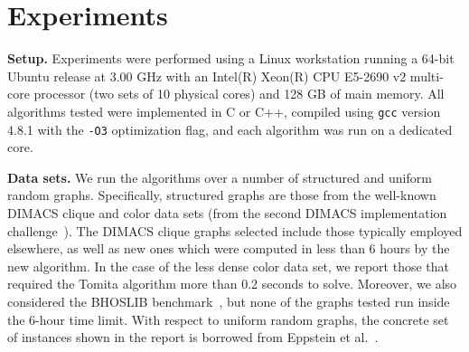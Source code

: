 \documentclass[final,1p]{elsarticle-modified}
\renewcommand{\paragraph}[1]{\medskip\noindent\textbf{#1.}}
\begin{document}
\section{Experiments}
\label{section:experiments}
\paragraph{Setup}
Experiments were performed using a Linux workstation running a 64-bit Ubuntu release at 3.00 GHz with an Intel(R) Xeon(R) CPU E5-2690 v2 multi-core processor (two sets of 10 physical cores) and 128 GB of main memory. All algorithms tested were implemented in C or C++, compiled using \texttt{gcc} version 4.8.1 with the \texttt{-O3} optimization flag, and each algorithm was run on a dedicated core.

\paragraph{Data sets}
We run the algorithms over a number of structured and uniform random graphs. Specifically, structured graphs are those from the well-known DIMACS clique and color data sets (from the second DIMACS implementation challenge~\cite{johnson1996}). The DIMACS clique graphs selected include those typically employed elsewhere, as well as new ones which were computed in less than 6 hours by the new algorithm. In the case of the less dense color data set, we report those that required the Tomita algorithm more than 0.2 seconds to solve. Moreover, we also considered the BHOSLIB benchmark~\cite{bhoslib}, but none of the graphs tested run inside the 6-hour time limit. With respect to uniform random graphs, the concrete set of instances shown in the report is borrowed from Eppstein et al.~\cite{els-2013}.
\end{document}

